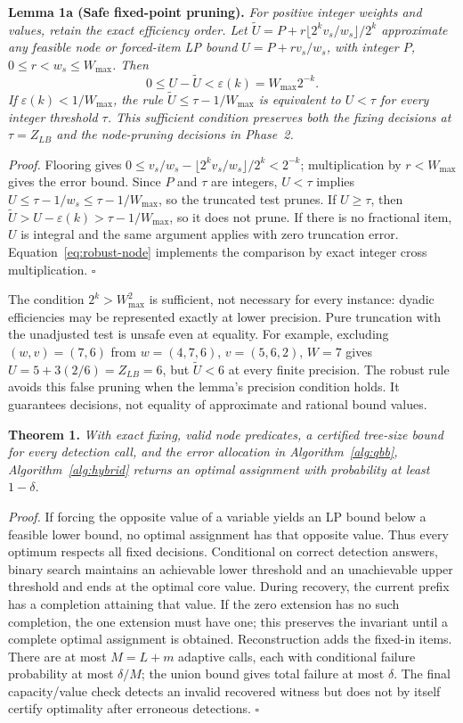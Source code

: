 \documentclass[pdflatex,sn-mathphys-num]{sn-jnl}
\begin{document}
\textbf{Lemma 1a (Safe fixed-point pruning).}\label{lem:precision}
\textit{For positive integer weights and values, retain the exact efficiency order. Let $\widetilde U=P+r\lfloor 2^kv_s/w_s\rfloor/2^k$ approximate any feasible node or forced-item LP bound $U=P+r v_s/w_s$, with integer $P$, $0\le r<w_s\le W_{\max}$. Then
\[
0\le U-\widetilde U<\varepsilon(k)=W_{\max}2^{-k}.
\]
If $\varepsilon(k)<1/W_{\max}$, the rule $\widetilde U\le\tau-1/W_{\max}$ is equivalent to $U<\tau$ for every integer threshold $\tau$. This sufficient condition preserves both the fixing decisions at $\tau=Z_{LB}$ and the node-pruning decisions in Phase~2.}

\textit{Proof.} Flooring gives $0\le v_s/w_s-\lfloor 2^kv_s/w_s\rfloor/2^k<2^{-k}$; multiplication by $r<W_{\max}$ gives the error bound. Since $P$ and $\tau$ are integers, $U<\tau$ implies $U\le\tau-1/w_s\le\tau-1/W_{\max}$, so the truncated test prunes. If $U\ge\tau$, then $\widetilde U>U-\varepsilon(k)>\tau-1/W_{\max}$, so it does not prune. If there is no fractional item, $U$ is integral and the same argument applies with zero truncation error. Equation~\eqref{eq:robust-node} implements the comparison by exact integer cross multiplication. $\square$

The condition $2^k>W_{\max}^2$ is sufficient, not necessary for every instance: dyadic efficiencies may be represented exactly at lower precision. Pure truncation with the unadjusted test is unsafe even at equality. For example, excluding $(w,v)=(7,6)$ from $w=(4,7,6)$, $v=(5,6,2)$, $W=7$ gives $U=5+3(2/6)=Z_{LB}=6$, but $\widetilde U<6$ at every finite precision. The robust rule avoids this false pruning when the lemma's precision condition holds. It guarantees decisions, not equality of approximate and rational bound values.

\textbf{Theorem 1.} \textit{With exact fixing, valid node predicates, a certified tree-size bound for every detection call, and the error allocation in Algorithm~\ref{alg:qbb}, Algorithm~\ref{alg:hybrid} returns an optimal assignment with probability at least $1-\delta$.}

\textit{Proof.} If forcing the opposite value of a variable yields an LP bound below a feasible lower bound, no optimal assignment has that opposite value. Thus every optimum respects all fixed decisions. Conditional on correct detection answers, binary search maintains an achievable lower threshold and an unachievable upper threshold and ends at the optimal core value. During recovery, the current prefix has a completion attaining that value. If the zero extension has no such completion, the one extension must have one; this preserves the invariant until a complete optimal assignment is obtained. Reconstruction adds the fixed-in items. There are at most $M=L+m$ adaptive calls, each with conditional failure probability at most $\delta/M$; the union bound gives total failure at most $\delta$. The final capacity/value check detects an invalid recovered witness but does not by itself certify optimality after erroneous detections. $\square$
\end{document}
